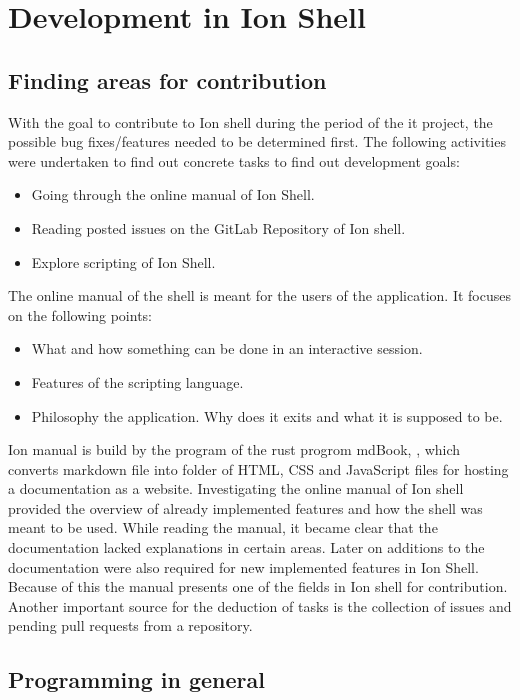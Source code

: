 \chapter{Development in Ion Shell}

\section{Finding areas for contribution}

With the goal to contribute to Ion shell during the period of the it project, the possible bug fixes/features needed to be determined first.
The following activities were undertaken to find out concrete tasks to find out development goals:

\begin{itemize}
	\item Going through the online manual of Ion Shell.
	\item Reading posted issues on the GitLab Repository of Ion shell.
	\item Explore scripting of Ion Shell.
\end{itemize}

The online manual of the shell is meant for the users of the application.
It focuses on the following points:

\begin{itemize}
	\item What and how something can be done in an interactive session.
	\item Features of the scripting language.
	\item Philosophy the application. Why does it exits and what it is supposed to be.
\end{itemize}

Ion manual is build by the program of the rust progrom mdBook, \cite{mdBook}, which converts markdown file into folder of
HTML, CSS and JavaScript files for hosting a documentation as a website.
Investigating the online manual of Ion shell provided the overview of already implemented features and how the shell was meant to be used.
While reading the manual, it became clear that the documentation lacked explanations in certain areas.
Later on additions to the documentation were also required for new implemented features in Ion Shell.
Because of this the manual presents one of the fields in Ion shell for contribution.
Another important source for the deduction of tasks is the collection of issues and pending pull requests from a repository.

\section{Programming in general}

